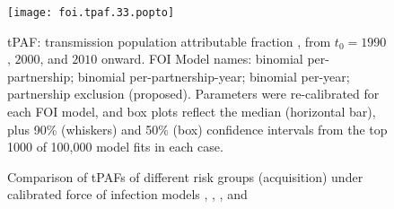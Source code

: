 \begin{figure}[h]
  \centerline{\texttt{[image: foi.tpaf.33.popto]}}
  \caption{Comparison of tPAFs of different risk groups (acquisition)
    under calibrated force of infection models , , , and }
  \label{fig:tpaf.33.popto}
  \floatfoot
  tPAF: transmission population attributable fraction \cite{Mishra2014},
  from $t_0 = 1990$, $2000$, and $2010$ onward.
  FOI Model names:
   binomial per-partnership;
   binomial per-partnership-year;
   binomial per-year;
   partnership exclusion (proposed).
  Parameters were re-calibrated for each FOI model,
  and box plots reflect the median (horizontal bar),
  plus 90\% (whiskers) and 50\% (box) confidence intervals from
  the top 1000 of 100,000 model fits in each case.
\end{figure}
